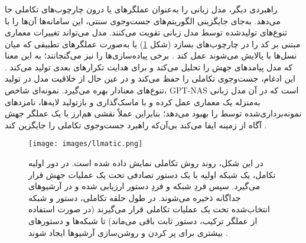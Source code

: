 \subsubsection{\protect{}}
راهبردی دیگر، مدل زبانی را به‌عنوان عملگرهای  یا  درون چارچوب‌های تکاملی جا می‌دهد. به‌جای جایگزینی الگوریتم‌های جست‌وجوی سنتی، این سامانه‌ها آن‌ها را با تنوع‌های تولیدشده توسط مدل زبانی تقویت می‌کنند. مدل می‌تواند تغییرات معماری مبتنی بر کد را در چارچوب‌های  بسازد (شکل \ref{fig:llmatic_flow}) \cite{LLMatic2024} یا به‌صورت عملگرهای تطبیقی که میان نسل‌ها با  پالایش می‌شوند عمل کند \cite{chen2023Evoprompting}. برخی پیاده‌سازی‌ها  را نیز می‌گنجانند؛ به این معنا که مدل پیامدهای جهش را تحلیل می‌کند و  برای هدایت تکرارهای بعدی تولید می‌کند \cite{ji2025RZNAS}. این ادغام،  جست‌وجوی تکاملی را حفظ می‌کند و در عین حال از خلاقیت مدل در تولید تنوع‌های معنادار بهره می‌گیرد. نمونه‌ای شاخص، GPT-NAS است که در آن مدل زبانی به‌منزله یک  معماری عمل کرده و با ماسک‌گذاری و بازتولید لایه‌ها، نامزدهای نمونه‌برداری‌شده توسط  را بهبود می‌دهد؛ بنابراین عملاً نقشی هم‌ارز با یک عملگر جهش آگاه از زمینه ایفا می‌کند بی‌آن‌که راهبرد جست‌وجوی تکاملی را جایگزین کند \cite{Yu2025GPTNAS}.

\begin{figure}[h]
    \centerline{\texttt{[image: images/llmatic.png]}}
    \caption[روند روش تکاملی]
    {
        در این شکل، روند روش تکاملی نمایش داده شده است. در دور اولیه تکامل، یک شبکه اولیه با یک دستور تصادفی تحت یک عملیات جهش قرار می‌گیرد. سپس فردِ شبکه و فردِ دستور ارزیابی شده و در آرشیوهای جداگانه ذخیره می‌شوند. در طول حلقه تکاملی، دستور و شبکه انتخاب‌شده تحت یک عملیات تکاملی قرار می‌گیرند (در صورت استفاده از عملگر ترکیب، دستور ثابت باقی می‌ماند) تا شبکه‌ها و دستورهای بیشتری برای پر کردن و روشن‌سازی آرشیوها ایجاد شوند \cite{LLMatic2024}.
    }
    \label{fig:llmatic_flow}
\end{figure}
